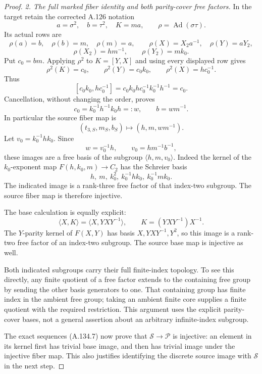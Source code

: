 \begin{proof}
\emph{2. The full marked fiber identity and both parity-cover free factors.}
In the target retain the corrected A.126 notation
\[
 a=\sigma^2,\quad b=\tau^2,\quad K=ma,\qquad
 \rho=\operatorname{Ad}(\sigma\tau).
\]
Its actual rows are
\[
 \rho(a)=b,\quad \rho(b)=m,\quad \rho(m)=a,\qquad
 \rho(X)=X_2a^{-1},\quad \rho(Y)=aY_2,
\]
\[
 \rho(X_2)=h m^{-1},\qquad \rho(Y_2)=m k_0.
 \tag{A.134.11}
\]
Put \(c_0=bm\). Applying \(\rho^2\) to \(K=[Y,X]\)
and using every displayed row gives
\[
 \rho^2(K)=c_0,\qquad
 \rho^2(Y)=c_0k_0,\qquad
 \rho^2(X)=h c_0^{-1}.
 \tag{A.134.12}
\]
Thus
\[
 [c_0k_0,hc_0^{-1}]
 =c_0k_0h c_0^{-1}k_0^{-1}h^{-1}=c_0.
\]
Cancellation, without changing the order, proves
\[
 c_0=k_0^{-1}h^{-1}k_0h=:w,\qquad
                         b=w m^{-1}.
 \tag{A.134.13}
\]
In particular the source fiber map is
\[
 (t_{3,S},m_S,b_S)\longmapsto
       (h,m,w m^{-1}).
 \tag{A.134.14}
\]
Let \(v_0=k_0^{-1}h k_0\). Since
\[
       w=v_0^{-1}h,\qquad
       v_0=h m^{-1}b^{-1},
 \tag{A.134.15}
\]
these images are a free basis of the subgroup
\(\langle h,m,v_0\rangle\).
Indeed the kernel of the \(k_0\)-exponent map
\(F(h,k_0,m)\to C_2\) has the Schreier basis
\[
       h,\ m,\ k_0^2,\ k_0^{-1}h k_0,\ k_0^{-1}m k_0.
 \tag{A.134.16}
\]
The indicated image is a rank-three free factor of that
index-two subgroup. The source fiber map is therefore injective.

The base calculation is equally explicit:
\[
 \langle X,K\rangle
   =\langle X,YXY^{-1}\rangle,
 \qquad K=(YXY^{-1})X^{-1}.
 \tag{A.134.17}
\]
The \(Y\)-parity kernel of \(F(X,Y)\) has basis
\(X,YXY^{-1},Y^2\), so this image is a rank-two free
factor of an index-two subgroup. The source base map is
injective as well.

Both indicated subgroups carry their full finite-index
topology. To see this directly, any finite quotient of a
free factor extends to the containing free group by sending
the other basis generators to one. That containing group
has finite index in the ambient free group; taking an
ambient finite core supplies a finite quotient with the
required restriction. This argument uses the explicit
parity-cover bases, not a general assertion about an
arbitrary infinite-index subgroup.

The exact sequences (A.134.7) now prove that
\(\mathcal S\to\mathcal P\) is injective: an element
in its kernel first has trivial base image, and then has
trivial image under the injective fiber map.
This also justifies identifying the discrete source image
with \(\mathcal S\) in the next step.


\end{proof}
